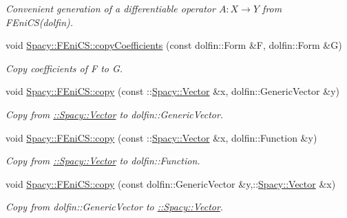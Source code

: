 \begin{DoxyCompactItemize}
\begin{DoxyCompactList}\small\item\em Convenient generation of a differentiable operator $A: X\rightarrow Y$ from F\+Eni\+C\+S(dolfin). \end{DoxyCompactList}\item 
void \hyperlink{group__FenicsGroup_gab3d4c7c1e91a50e4e816598258b6edce_gab3d4c7c1e91a50e4e816598258b6edce}{Spacy\+::\+F\+Eni\+C\+S\+::copy\+Coefficients} (const dolfin\+::\+Form \&F, dolfin\+::\+Form \&G)
\begin{DoxyCompactList}\small\item\em Copy coefficients of F to G. \end{DoxyCompactList}\item 
void \hyperlink{group__FenicsGroup_ga7f43f0c660d0646adb031b453c536bb0_ga7f43f0c660d0646adb031b453c536bb0}{Spacy\+::\+F\+Eni\+C\+S\+::copy} (const \+::\hyperlink{classSpacy_1_1Vector}{Spacy\+::\+Vector} \&x, dolfin\+::\+Generic\+Vector \&y)
\begin{DoxyCompactList}\small\item\em Copy from \hyperlink{group__SpacyGroup_gafc144d2730ef87a67e54f8cd750b1f54_VectorAnchor}{\+:\+:Spacy\+:\+:Vector} to dolfin\+::\+Generic\+Vector. \end{DoxyCompactList}\item 
void \hyperlink{group__FenicsGroup_ga28fb1ebae29e07ec0256bb2331599aa7_ga28fb1ebae29e07ec0256bb2331599aa7}{Spacy\+::\+F\+Eni\+C\+S\+::copy} (const \+::\hyperlink{classSpacy_1_1Vector}{Spacy\+::\+Vector} \&x, dolfin\+::\+Function \&y)
\begin{DoxyCompactList}\small\item\em Copy from \hyperlink{group__SpacyGroup_gafc144d2730ef87a67e54f8cd750b1f54_VectorAnchor}{\+:\+:Spacy\+:\+:Vector} to dolfin\+::\+Function. \end{DoxyCompactList}\item 
void \hyperlink{group__FenicsGroup_ga61c5e45dbb789c155fbf86f8ec288f17_ga61c5e45dbb789c155fbf86f8ec288f17}{Spacy\+::\+F\+Eni\+C\+S\+::copy} (const dolfin\+::\+Generic\+Vector \&y,\+::\hyperlink{classSpacy_1_1Vector}{Spacy\+::\+Vector} \&x)
\begin{DoxyCompactList}\small\item\em Copy from dolfin\+::\+Generic\+Vector to \hyperlink{group__SpacyGroup_gafc144d2730ef87a67e54f8cd750b1f54_VectorAnchor}{\+:\+:Spacy\+:\+:Vector}. \end{DoxyCompactList}\item 

\end{DoxyCompactItemize}
